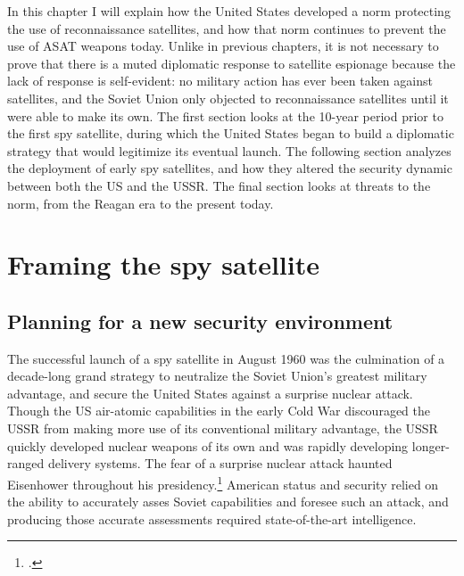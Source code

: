 \documentclass{memoir}
\begin{document}
In this chapter I will explain how the United States developed a norm protecting the use of reconnaissance satellites, and how that norm continues to prevent the use of ASAT weapons today. Unlike in previous chapters, it is not necessary to prove that there is a muted diplomatic response to satellite espionage because the lack of response is self-evident: no military action has ever been taken against satellites, and the Soviet Union only objected to reconnaissance satellites until it were able to make its own. The first section looks at the 10-year period prior to the first spy satellite, during which the United States began to build a diplomatic strategy that would legitimize its eventual launch. The following section analyzes the deployment of early spy satellites, and how they altered the security dynamic between both the US and the USSR. The final section looks at threats to the norm, from the Reagan era to the present today.

\section{Framing the spy satellite}
\subsection{Planning for a new security environment}
The successful launch of a spy satellite in August 1960 was the culmination of a decade-long grand strategy to neutralize the Soviet Union's greatest military advantage, and secure the United States against a surprise nuclear attack. Though the US air-atomic capabilities in the early Cold War discouraged the USSR from making more use of its conventional military advantage, the USSR quickly developed nuclear weapons of its own and was rapidly developing longer-ranged delivery systems. The fear of a surprise nuclear attack haunted Eisenhower throughout his presidency.\footcite[p.~68]{killian_sputnik_1977} American status and security relied on the ability to accurately asses Soviet capabilities and foresee such an attack, and producing those accurate assessments required state-of-the-art intelligence.
\end{document}
